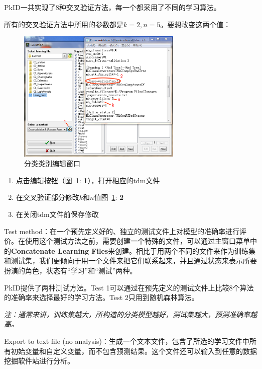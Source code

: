 \documentclass[12pt]{article}
\begin{document}
PkID一共实现了8种交叉验证方法，每一个都采用了不同的学习算法。

所有的交叉验证方法中所用的参数都是$k = 2, n = 5$。要想改变这两个值：

\begin{figure}[!ht]
\centering
\includegraphics[width=0.7\textwidth]{ModificationofCrossValidationParameterisation.eps}
\caption{分类类别编辑窗口}
\label{fig: ModificationofCrossValidationParameterisation}
\end{figure}

\begin{enumerate}
\item 点击编辑按钮（图~\ref{fig: ModificationofCrossValidationParameterisation}: {\color{red}\textbf{1}}），打开相应的tdm文件
\item 在交叉验证部分修改$k$和$n$值图~\ref{fig: ModificationofCrossValidationParameterisation}: {\color{red}\textbf{2}}
\item 在关闭tdm文件前保存修改
\end{enumerate}

{\color{red}Test method}：在一个预先定义好的、独立的测试文件上对模型的准确率进行评价。在使用这个测试方法之前，需要创建一个特殊的文件，可以通过主窗口菜单中的\textbf{Concatenate Learning Files}来创建。相比于用两个不同的文件来作为训练集和测试集，我们更倾向于用一个文件来把它们联系起来，并且通过状态来表示所要扮演的角色，状态有“学习”和“测试”两种。

PkID提供了两种测试方法。Test 1可以通过在预先定义的测试文件上比较8个算法的准确率来选择最好的学习方法。Test 2只用到随机森林算法。

{\color{blue}\textit{注：通常来讲，训练集越大，所构造的分类模型越好，测试集越大，预测准确率越高。}}

{\color{red}Export to text file (no analysis)}：生成一个文本文件，包含了所选的学习文件中所有初始变量和自定义变量，而不包含预测结果。这个文件还可以输入到任意的数据挖掘软件站进行分析。
\end{document}
